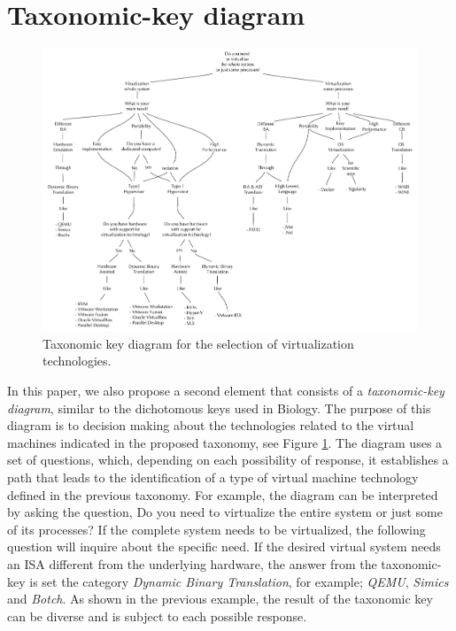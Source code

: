 \section {Taxonomic-key diagram}           \label{sec:choosingVirtualizationTechnology}
	\begin{figure}[ht]
		\centering
		\includegraphics[width=18cm]{images/taxonomic-KeyDiagramV2.pdf}
		\vspace{-0.2cm}
		\caption{Taxonomic key diagram for the selection of virtualization technologies.}
		\label{fig:taxonomic-keyDiagram}
	\end{figure}
	
	In this paper, we also propose a second element that consists of a \textit{taxonomic-key diagram}, similar to the dichotomous keys used in Biology. The purpose of this diagram is to decision making about the technologies related to the virtual machines indicated in the proposed taxonomy, see Figure \ref{fig:taxonomic-keyDiagram}. The diagram uses a set of questions, which, depending on each possibility of response, it establishes a path that leads to the identification of a type of virtual machine technology defined in the previous taxonomy. For example, the diagram can be interpreted by asking the question, Do you need to virtualize the entire system or just some of its processes? If the complete system needs to be virtualized, the following question will inquire about the specific need. If the desired virtual system needs an ISA different from the underlying hardware, the answer from the taxonomic-key is set the category \textit {Dynamic Binary Translation}, for example; \textit{QEMU}, \textit{Simics} and \textit{Botch}. As shown in the previous example, the result of the taxonomic key can be diverse and is subject to each possible response.
